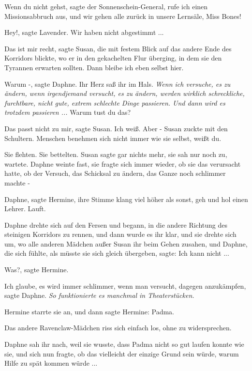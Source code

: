 \glqq{}Wenn du nicht gehst\grqq{}, sagte der Sonnenschein-General, \glqq{}rufe ich
einen Missionsabbruch aus, und wir gehen alle zurück in unsere Lernsäle, Miss
Bones!\grqq{}

\glqq{}Hey!\grqq{}, sagte Lavender. \glqq{}Wir haben nicht abgestimmt ...\grqq{}

\glqq{}Das ist mir recht\grqq{}, sagte Susan, die mit festem Blick auf das andere
Ende des Korridors blickte, wo er in den gekachelten Flur überging, in dem sie
den Tyrannen erwarten sollten. \glqq{}Dann bleibe ich eben selbst hier.\grqq{}

\glqq{}Warum -\grqq{}, sagte Daphne. Ihr Herz saß ihr im Hals. \emph{Wenn ich
versuche, es zu ändern, wenn irgendjemand versucht, es zu ändern, werden
wirklich schreckliche, furchtbare, nicht gute, extrem schlechte Dinge passieren.
Und dann wird es trotzdem passieren ...} \glqq{}Warum tust du das?\grqq{}

\glqq{}Das passt nicht zu mir\grqq{}, sagte Susan. \glqq{}Ich weiß. Aber -\grqq{}
Susan zuckte mit den Schultern. \glqq{}Menschen benehmen sich nicht immer wie sie
selbst, weißt du.\grqq{}

Sie flehten. Sie bettelten. Susan sagte gar nichts mehr, sie sah nur noch zu,
wartete. Daphne weinte fast, sie fragte sich immer wieder, ob sie das verursacht
hatte, ob der Versuch, das Schicksal zu ändern, das Ganze noch schlimmer machte
-

\glqq{}Daphne\grqq{}, sagte Hermine, ihre Stimme klang viel höher als sonst,
\glqq{}geh und hol einen Lehrer. Lauft.\grqq{}

Daphne drehte sich auf den Fersen und begann, in die andere Richtung des
steinigen Korridors zu rennen, und dann wurde es ihr klar, und sie drehte sich
um, wo alle anderen Mädchen außer Susan ihr beim Gehen zusahen, und Daphne, die
sich fühlte, als müsste sie sich gleich übergeben, sagte: \glqq{}Ich kann
nicht ...\grqq{}

\glqq{}Was?\grqq{}, sagte Hermine.

\glqq{}Ich glaube, es wird immer schlimmer, wenn man versucht, dagegen
anzukämpfen\grqq{}, sagte Daphne. \emph{So funktionierte es manchmal in
Theaterstücken.}

Hermine starrte sie an, und dann sagte Hermine: \glqq{}Padma.\grqq{}

Das andere Ravenclaw-Mädchen riss sich einfach los, ohne zu widersprechen.

Daphne sah ihr nach, weil sie wusste, dass Padma nicht so gut laufen konnte wie
sie, und sich nun fragte, ob das vielleicht der einzige Grund sein würde, warum
Hilfe zu spät kommen würde ...

